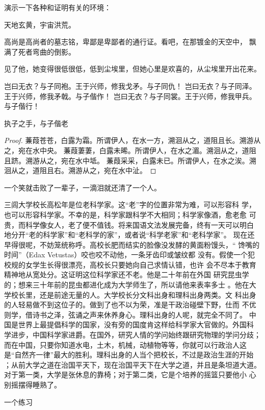 演示一下各种和证明有关的环境：
\begin{definition}
天地玄黄，宇宙洪荒。
\end{definition}
\begin{proposition}
高尚是高尚者的墓志铭，卑鄙是卑鄙者的通行证。看吧，在那镀金的天空中，
飘满了死者弯曲的倒影。
\end{proposition}
\begin{axiom}
见了他，她变得很低很低，低到尘埃里，但她心里是欢喜的，从尘埃里开出花来。
\end{axiom}
\begin{lemma}
岂曰无衣？与子同袍。王于兴师，修我戈矛。与子同仇！
岂曰无衣？与子同泽。王于兴师，修我矛戟。与子偕作！
岂曰无衣？与子同裳。王于兴师，修我甲兵。与子偕行！
\end{lemma}
\begin{theorem}
执子之手，与子偕老
\end{theorem}
\begin{proof}
蒹葭苍苍，白露为霜。所谓伊人，在水一方，溯洄从之，道阻且长。溯游从之，宛在水中央。
蒹葭萋萋，白露未晞。所谓伊人，在水之湄。溯洄从之，道阻且跻。溯游从之，宛在水中坻。
蒹葭采采，白露未已。所谓伊人，在水之涘。溯洄从之，道阻且右。溯游从之，宛在水中沚。
\end{proof}
\begin{corollary}
一个笑就击败了一辈子，一滴泪就还清了一个人。
\end{corollary}
\begin{example}
三闾大学校长高松年是位老科学家。这“老”字的位置非常为难，可以形容科
学，也可以形容科学家。不幸的是，科学家跟科学不大相同；科学家像酒，愈老愈
可贵，而科学像女人，老了便不值钱。将来国语文法发展完备，终有一天可以明白
地分开“老的科学家”和“老科学的家”，或者说“科学老家”和“老科学家”。
现在还早得很呢，不妨笼统称呼。高校长肥而结实的脸像没发酵的黄面粉馒头，“
馋嘴的时间”（Edax Vetustas）咬也咬不动他，一条牙齿印或皱纹都
没有。假使一个犯校规的女学生长得很漂亮，高校长只要她向自己求情认错，也许
会不尽本于教育精神地从宽处分。这证明这位科学家还不老。他是二十年前在外国
研究昆虫学的；想来三十年前的昆虫都进化成为大学师生了，所以请他来表率多士
。他在大学校长里，还是前途无量的人。大学校长分文科出身和理科出身两类。文
科出身的人轻易做不到这位子的。做到了也不以为荣，准是干政治碰壁下野，仕而
不优则学，借诗书之泽，弦诵之声来休养身心。理科出身的人呢，就完全不同了。
中国是世界上最提倡科学的国家，没有旁的国度肯这样给科学家大官做的。外国科
学进步，中国科学家进爵。在国外，研究人情的学问始终跟研究物理的学问分歧；
而在中国，只要你知道水电，土木，机械，动植物等等，你就可以行政治人\pozhehao 这
是“自然齐一律”最大的胜利。理科出身的人当个把校长，不过是政治生涯的开始
；从前大学之道在治国平天下，现在治国平天下在大学之道，并且是条坦道大道。
对于第一类，大学是张休息的靠椅；对于第二类，它是个培养的摇篮\pozhehao 只要他小
心别摇摆得睡熟了。
\end{example}
\begin{exercise}
一个练习
\end{exercise}

